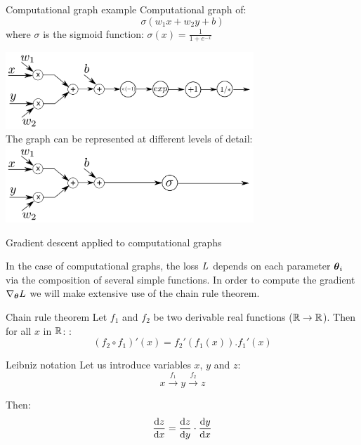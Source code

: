 \documentclass[xcolor=pdftex,dvipsnames,table,mathserif]{beamer}
\begin{document}
\begin{frame}{Computational graph example}
  Computational graph of:
  \[
  \sigma(w_1x + w_2y + b)
  \]
  where $\sigma$ is the sigmoid function: $\sigma(x) = \frac{1}{1 + e^{-x}}$

\vspace{3em}
\pause

  \centering
  \includegraphics[width=0.7\textwidth]{comp_graph2}\\
  \pause
  The graph can be represented at different levels of detail:
  \includegraphics[width=0.7\textwidth]{comp_graph}

\end{frame}

\begin{frame}{Gradient descent applied to computational graphs}

  In the case of computational graphs, the loss $L$ depends on each parameter $\boldsymbol{\theta}_i$ via the composition of several simple functions. In order to compute the gradient $\nabla_{\boldsymbol{\theta}}L$ we will make extensive use of the chain rule theorem.

  \begin{block}{Chain rule theorem}
    Let $f_1$ and $f_2$ be two derivable real functions ($\mathbb{R} \rightarrow \mathbb{R}$). Then for all $x$ in $\mathbb{R}$:   :
    \[
     (f_2 \circ f_1)'(x) = f_2'(f_1(x)).f_1'(x)
    \]
  \end{block}


\begin{block}{Leibniz notation}
  Let us introduce variables $x$, $y$ and $z$:
  \[x \xrightarrow{f_1} y \xrightarrow{f_2} z\]

  Then:
  \[\dv{z}{x} = \dv{z}{y} \cdot \dv{y}{x} \]

\end{block}

\end{frame}
\end{document}
